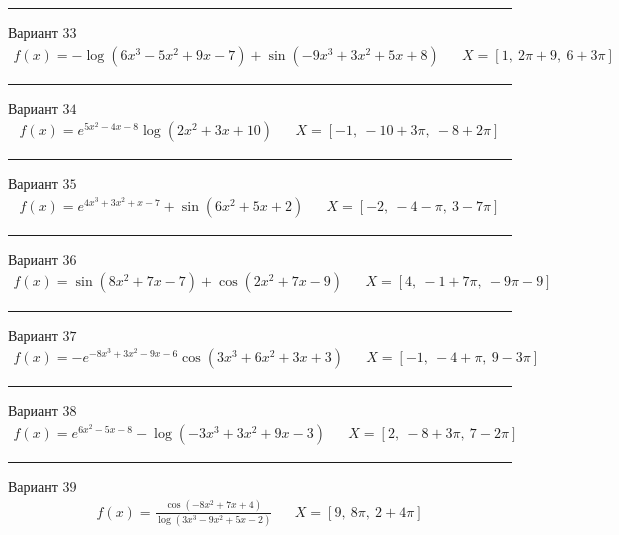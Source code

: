 \documentclass[11pt]{report}
\begin{document}
\begin{center}
    \noindent\rule{8cm}{0.4pt}
\end{center}
Вариант \(33\)
\begin{align*}
    f(x) = - \log{\left(6 x^{3} - 5 x^{2} + 9 x - 7 \right)} + \sin{\left(- 9 x^{3} + 3 x^{2} + 5 x + 8 \right)} && X = \left[ 1, \  2 \pi + 9, \  6 + 3 \pi\right]
\end{align*}
\begin{center}
    \noindent\rule{8cm}{0.4pt}
\end{center}
Вариант \(34\)
\begin{align*}
    f(x) = e^{5 x^{2} - 4 x - 8} \log{\left(2 x^{2} + 3 x + 10 \right)} && X = \left[ -1, \  -10 + 3 \pi, \  -8 + 2 \pi\right]
\end{align*}
\begin{center}
    \noindent\rule{8cm}{0.4pt}
\end{center}
Вариант \(35\)
\begin{align*}
    f(x) = e^{4 x^{3} + 3 x^{2} + x - 7} + \sin{\left(6 x^{2} + 5 x + 2 \right)} && X = \left[ -2, \  -4 - \pi, \  3 - 7 \pi\right]
\end{align*}
\begin{center}
    \noindent\rule{8cm}{0.4pt}
\end{center}
Вариант \(36\)
\begin{align*}
    f(x) = \sin{\left(8 x^{2} + 7 x - 7 \right)} + \cos{\left(2 x^{2} + 7 x - 9 \right)} && X = \left[ 4, \  -1 + 7 \pi, \  - 9 \pi - 9\right]
\end{align*}
\begin{center}
    \noindent\rule{8cm}{0.4pt}
\end{center}
Вариант \(37\)
\begin{align*}
    f(x) = - e^{- 8 x^{3} + 3 x^{2} - 9 x - 6} \cos{\left(3 x^{3} + 6 x^{2} + 3 x + 3 \right)} && X = \left[ -1, \  -4 + \pi, \  9 - 3 \pi\right]
\end{align*}
\begin{center}
    \noindent\rule{8cm}{0.4pt}
\end{center}
Вариант \(38\)
\begin{align*}
    f(x) = e^{6 x^{2} - 5 x - 8} - \log{\left(- 3 x^{3} + 3 x^{2} + 9 x - 3 \right)} && X = \left[ 2, \  -8 + 3 \pi, \  7 - 2 \pi\right]
\end{align*}
\begin{center}
    \noindent\rule{8cm}{0.4pt}
\end{center}
Вариант \(39\)
\begin{align*}
    f(x) = \frac{\cos{\left(- 8 x^{2} + 7 x + 4 \right)}}{\log{\left(3 x^{3} - 9 x^{2} + 5 x - 2 \right)}} && X = \left[ 9, \  8 \pi, \  2 + 4 \pi\right]
\end{align*}
\end{document}
